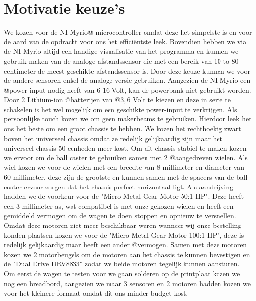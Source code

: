 \documentclass[a4paper,twoside,kulak]{kulakreport}
\begin{document}
	\chapter*{Motivatie keuze's}
	We kozen voor de NI Myrio@-microcontroller omdat deze het simpelste is en voor de aard van de opdracht voor ons het efficiëntste leek. Bovendien hebben we via de NI Myrio altijd een handige visualisatie van het programma en kunnen we gebruik maken van de analoge afstandssensor die met een bereik van 10 to 80 centimeter de meest geschikte afstandssensor is.
	Door deze keuze kunnen we voor de andere sensoren enkel de analoge versie gebruiken. Aangezien de NI Myrio een @power input nodig heeft van 6-16 Volt, kan de powerbank niet gebruikt worden. Door 2 Lithium-ion @batterijen van @$3,6$ Volt te kiezen en deze in serie te schakelen is het wel mogelijk om een geschikte power-input te verkrijgen.
	Als persoonlijke touch kozen we om geen makerbeams te gebruiken. Hierdoor leek het ons het beste om een groot chassis te hebben. We kozen het rechthoekig zwart boven het universeel chassis omdat ze redelijk gelijkaardig zijn maar het universeel chassis 50 eenheden meer kost. Om dit chassis stabiel te maken kozen we ervoor om de ball caster te gebruiken samen met 2 @aangedreven wielen. Als wiel kozen we voor de wielen met een breedte van 8 millimeter en diameter van 60 millimeter, deze zijn de grootste en kunnen samen met de spacers van de ball caster ervoor zorgen dat het chassis perfect horizontaal ligt. Als aandrijving hadden we de voorkeur voor de "Micro Metal Gear Motor 50:1 HP". Deze heeft een 3 millimeter as, wat compatibel is met onze gekozen wielen en heeft een gemiddeld vermogen om de wagen te doen stoppen en opnieuw te versnellen. Omdat deze motoren niet meer beschikbaar waren wanneer wij onze bestelling konden plaatsen kozen we voor de "Micro Metal Gear Motor 100:1 HP", deze is redelijk gelijkaardig maar heeft een ander @vermogen. Samen met deze motoren kozen we 2 motorbeugels om de motoren aan het chassis te kunnen bevestigen en de "Dual Drive DRV8833" zodat we beide motoren tegelijk kunnen aansturen.
	Om eerst de wagen te testen voor we gaan solderen op de printplaat kozen we nog een breadbord, aangezien we maar 3 sensoren en 2 motoren hadden kozen we voor het kleinere formaat omdat dit ons minder budget kost.  
	
	
\end{document}
